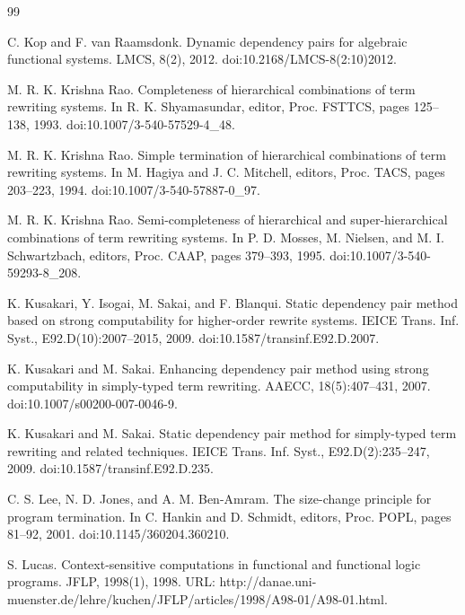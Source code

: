 \documentclass[10pt,a4paper]{amsart}
\begin{document}
\begin{thebibliography}{99}
\par\noindent  [30]  C. Kop and F. van Raamsdonk.  Dynamic dependency pairs for algebraic functional systems.  LMCS, 8(2), 2012.  doi:10.2168/LMCS-8(2:10)2012.  
 
\par\noindent  [31]  M. R. K. Krishna Rao.  Completeness of hierarchical combinations of term rewriting systems.  In R. K. Shyamasundar, editor, Proc. FSTTCS, pages 125–138, 1993.  doi:10.1007/3-540-57529-4\_48.  
 
\par\noindent  [32]  M. R. K. Krishna Rao.  Simple termination of hierarchical combinations of term rewriting systems.  In M. Hagiya and J. C. Mitchell, editors, Proc. TACS, pages 203–223, 1994.  doi:10.1007/3-540-57887-0\_97.  
 
\par\noindent  [33]  M. R. K. Krishna Rao.  Semi-completeness of hierarchical and super-hierarchical combinations of term rewriting systems.  In P. D. Mosses, M. Nielsen, and M. I. Schwartzbach, editors, Proc. CAAP, pages 379–393, 1995.  doi:10.1007/3-540-59293-8\_208.  
 
\par\noindent  [34]  K. Kusakari, Y. Isogai, M. Sakai, and F. Blanqui.  Static dependency pair method based on strong computability for higher-order rewrite systems.  IEICE Trans. Inf. Syst., E92.D(10):2007–2015, 2009.  doi:10.1587/transinf.E92.D.2007.  
 
\par\noindent  [35]  K. Kusakari and M. Sakai.  Enhancing dependency pair method using strong computability in simply-typed term rewriting.  AAECC, 18(5):407–431, 2007.  doi:10.1007/s00200-007-0046-9.  
 
\par\noindent  [36]  K. Kusakari and M. Sakai.  Static dependency pair method for simply-typed term rewriting and related techniques.  IEICE Trans. Inf. Syst., E92.D(2):235–247, 2009.  doi:10.1587/transinf.E92.D.235.  
 
\par\noindent  [37]  C. S. Lee, N. D. Jones, and A. M. Ben-Amram.  The size-change principle for program termination.  In C. Hankin and D. Schmidt, editors, Proc. POPL, pages 81–92, 2001.  doi:10.1145/360204.360210.  
 
\par\noindent  [38]  S. Lucas.  Context-sensitive computations in functional and functional logic programs.  JFLP, 1998(1), 1998.  URL: http://danae.uni-muenster.de/lehre/kuchen/JFLP/articles/1998/A98-01/A98-01.html.  
 

\end{thebibliography}
\end{document}
